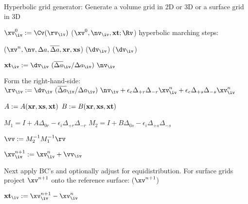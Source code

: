 \begin{algorithm}
\caption{Hyperbolic grid generator: Generate a volume grid in 2D or 3D or a surface grid in 3D}
\begin{algorithmic}[1]
  \State $\xv^0_\iv := \Cv(\rv_\iv)$ 
    \State {}($\xv^0, \nv_\iv, \xt; \Rv$)
  \EndIf
  \State
  \State hyperbolic marching steps:

    \State {}($\xv^n, \nv, \da, \das, \xr, \xs$)
    \State {}($\dv_\iv$)  
    \State {}($\dv_\iv$)  

      \State $\xt_\iv := \dv_\iv~({\das_\iv / \da_\iv})~\nv_\iv$ 
    \EndIf

    \State Form the right-hand-side:
    \State $\rv_\iv := \dv_\iv~({\das_\iv / \da_\iv})~\nv_\iv + \epsilon_e \Delta_{+r}\Delta_{-r} \xv^n_\iv + \epsilon_e \Delta_{+s}\Delta_{-s} \xv^n_\iv$

    \State $A := A({\bf xr},{\bf xs},{\bf xt})$ 
    \State $B := B({\bf xr},{\bf xs},{\bf xt})$

    \State $M_1 = I + A \Delta_{0r} - \epsilon_i \Delta_{+r}\Delta_{-r}$
    \State $ M_2 = I + B \Delta_{0s} - \epsilon_i \Delta_{+s}\Delta_{-s}$ 

    \State $\vv :=  M_2^{-1}M_1^{-1} \rv$ 

    \State $\xv^{n+1}_\iv := \xv^n_\iv + \vv_\iv$

    \State 
    \State Next apply BC's and optionally adjust for equidistribution.
    \State For surface grids project $\xv^{n+1}$ onto the reference surface:
    \State {}($\xv^{n+1}$)  
  
    \State 
    \State $\xt_\iv := \xv^{n+1}_\iv - \xv^n_\iv$  

  \EndFor
\EndFunction
\end{algorithmic}
\end{algorithm}




